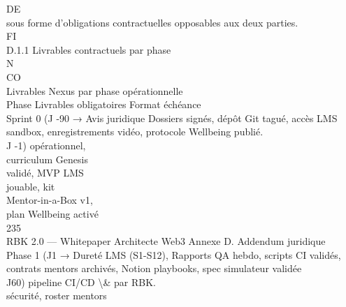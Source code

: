 DE\\
sous forme d’obligations contractuelles opposables aux deux parties.\\
\vspace{0.5em}
\vspace{0.5em}
\vspace{0.5em}
\vspace{0.5em}
FI\\
D.1.1 Livrables contractuels par phase\\
\vspace{0.5em}
\vspace{0.5em}
N\\
CO\\
Livrables Nexus par phase opérationnelle\\
\vspace{0.5em}
\vspace{0.5em}
\vspace{0.5em}
Phase                 Livrables obligatoires    Format échéance\\
Sprint 0 (J -90 →     Avis juridique            Dossiers signés, dépôt Git tagué, accès LMS sandbox, enregistrements vidéo, protocole Wellbeing publié.\\
J -1)                 opérationnel,\\
curriculum Genesis\\
validé, MVP LMS\\
jouable, kit\\
Mentor-in-a-Box v1,\\
plan Wellbeing activé\\
\vspace{0.5em}
\vspace{0.5em}
\vspace{0.5em}
\vspace{0.5em}
235\\
RBK 2.0 — Whitepaper Architecte Web3                                                                                             Annexe D. Addendum juridique\\
\vspace{0.5em}
\vspace{0.5em}
\vspace{0.5em}
Phase 1 (J1 →         Dureté LMS (S1-S12),       Rapports QA hebdo, scripts CI validés, contrats mentors archivés, Notion playbooks, spec simulateur validée\\
J60)                  pipeline CI/CD \textbackslash{}&           par RBK.\\
sécurité, roster mentors\\
